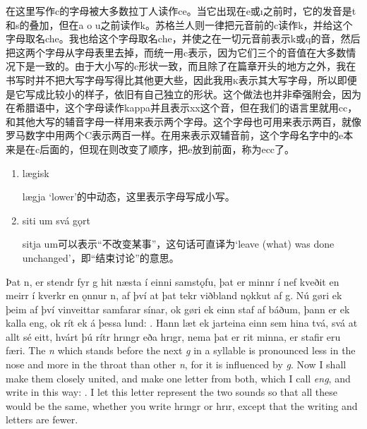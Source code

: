\begin{translation*}{}
  在这里写作c的字母被大多数拉丁人读作ce。当它出现在e或ı之前时，它的发音是t和s的叠加，但在a o u之前读作k。苏格兰人则一律把元音前的c读作k，并给这个字母取名che。我也给这个字母取名che，并使之在一切元音前表示k或q的音，然后把这两个字母从字母表里去掉，而统一用c表示，因为它们三个的音值在大多数情况下是一致的。由于大小写的c形状一致，而且除了在篇章开头的地方之外，我在书写时并不把大写字母写得比其他更大些，因此我用\textsc{k}表示其大写字母，所以即便是它写成比较小的样子，依旧有自己独立的形状。这个做法也并非牵强附会，因为在希腊语中，这个字母读作kappa并且表示xx这个音，但在我们的语言里就用cc，和其他大写的辅音字母一样用来表示两个字母。这个字母也可用来表示两百，就像罗马数字中用两个C表示两百一样。在用来表示双辅音前，这个字母名字中的e本来是在c后面的，但现在则改变了顺序，把e放到前面，称为ecc了。
\end{translation*}
\begin{grammar*}{}
  \begin{enumerate}[leftmargin=*]
    \item lægisk

          lægja `lower'的中动态，这里表示字母写成小写。

    \item siti um svá gǫrt

          sitja um可以表示“不改变某事”，这句话可直译为`leave (what) was done unchanged'，即“结束讨论”的意思。
  \end{enumerate}
\end{grammar*}
\begin{paracol}{2}
  Þat n, er stendr fyr g hit næsta í einni samstǫfu, þat er minnr í nef kveðit en meirr í kverkr en ǫnnur n, af því at þat tekr viðbland nǫkkut af g. Nú gøri ek þeim af því vinveittar samfarar sínar, ok gøri ek einn staf af báðum, þann er ek kalla eng, ok rít ek á þessa lund: \textcrg . Hann læt ek jarteina einn sem hina tvá, svá at allt sé eitt, hvárt þú rítr hrıngr eða hrıgr, nema þat er rit minna, er stafir eru færi.
  \switchcolumn
  The \textit{n} which stands before the next \textit{g} in a syllable is pronounced less in the nose and more in the throat than other \textit{n}, for it is influenced by \textit{g}. Now I shall make them closely united, and make one letter from both, which I call \textit{eng}, and write in this way: \textcrg . I let this letter represent the two sounds so that all these would be the same, whether you write hrıngr or hrı\textcrg r, except that the writing and letters are fewer.
\end{paracol}
